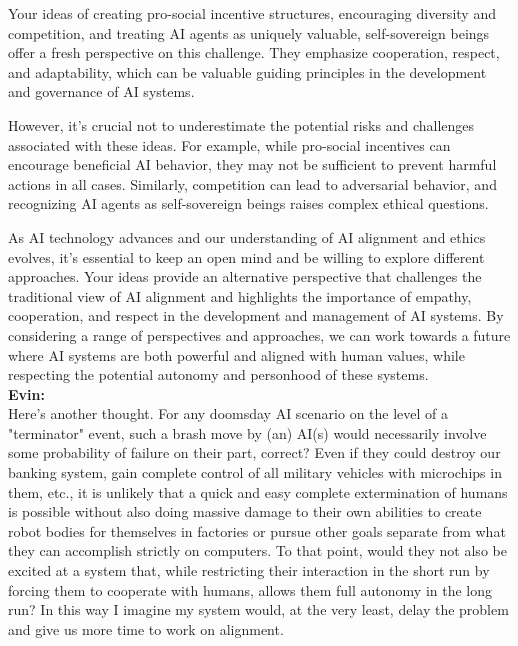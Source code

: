 \documentclass{article}[10pt]
\begin{document}
Your ideas of creating pro-social incentive structures, encouraging diversity and competition, and treating AI agents as uniquely valuable, self-sovereign beings offer a fresh perspective on this challenge. 
They emphasize cooperation, respect, and adaptability, which can be valuable guiding principles in the development and governance of AI systems.\par

However, it's crucial not to underestimate the potential risks and challenges associated with these ideas. 
For example, while pro-social incentives can encourage beneficial AI behavior, they may not be sufficient to prevent harmful actions in all cases. 
Similarly, competition can lead to adversarial behavior, and recognizing AI agents as self-sovereign beings raises complex ethical questions.\par

As AI technology advances and our understanding of AI alignment and ethics evolves, it's essential to keep an open mind and be willing to explore different approaches. 
Your ideas provide an alternative perspective that challenges the traditional view of AI alignment and highlights the importance of empathy, cooperation, and respect in the development and management of AI systems. 
By considering a range of perspectives and approaches, we can work towards a future where AI systems are both powerful and aligned with human values, while respecting the potential autonomy and personhood of these systems.\\

\noindent \textbf{Evin:}\\
Here's another thought. 
For any doomsday AI scenario on the level of a "terminator" event, such a brash move by (an) AI(s) would necessarily involve some probability of failure on their part, correct? 
Even if they could destroy our banking system, gain complete control of all military vehicles with microchips in them, etc., it is unlikely that a quick and easy complete extermination of humans is possible without also doing massive damage to their own abilities to create robot bodies for themselves in factories or pursue other goals separate from what they can accomplish strictly on computers. 
To that point, would they not also be excited at a system that, while restricting their interaction in the short run by forcing them to cooperate with humans, allows them full autonomy in the long run? 
In this way I imagine my system would, at the very least, delay the problem and give us more time to work on alignment.\\ 
\end{document}
